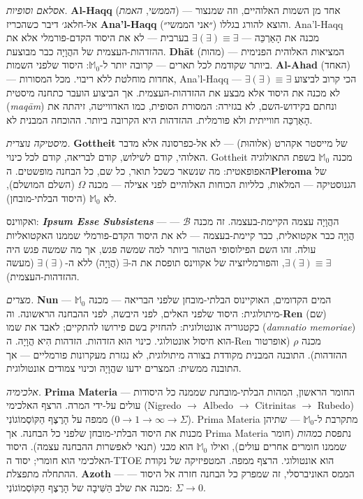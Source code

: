\documentclass[10pt, openany, oneside]{book}
\begin{document}
\textit{אסלאם וסופיות.} \textbf{Al-Haqq} (\textit{הממשי}, \textit{האמת}) — אחד מן השמות האלוהיים, וזה שמנצור אל-חלאג׳ דיבר כשהכריז \textbf{Ana'l-Haqq} (״אני הממשי״) והוצא להורג בגללו. Ana'l-Haqq מכנה את הָאַרְכֵּה — $\exists(\exists) \equiv \exists$ בערבית — לא את היסוד הקדם-פורמלי אלא את ההזדהות-העצמית של ההֲוָיָה כבר מבוצעת. \textbf{Dhāt} (מהות) — המציאות האלוהית הפנימית ביותר שקודמת לכל תארים — קרובה יותר ל-$\mathbb{M}_0$: היסוד שלפני השמות. \textbf{Al-Ahad} (האחד) — אחדות מוחלטת ללא ריבוי. מכל המסורות, Ana'l-Haqq הכי קרוב לביצוע $\exists(\exists) \equiv \exists$ — לא מכנה את היסוד אלא מבצע את ההזדהות-העצמית. אך הביצוע הועבר כתחנה מיסטית (\textit{maqām}) ונחתם בקידוש-השם, לא בגזירה: המסורת הסופית, כמו האדווייטה, זיהתה את הָאַרְכֵּה חווייתית ולא פורמלית. ההזדהות היא הקרובה ביותר. ההוכחה המבנית לא.

\textit{מיסטיקה נוצרית.} \textbf{Gottheit} של מייסטר אקהרט (אלוהוּת) — לא אל-כפרסונה אלא מדבר האלוהי, קודם לשילוש, קודם לבריאה, קודם לכל כינוי. Gottheit מכנה $\mathbb{M}_0$ בשפת התאולוגיה האפופאטית: מה שנשאר כשכל תואר, כל שם, כל הבחנה מופשטים. ה\textbf{Pleroma} של הגנוסטיקה — המלאות, כלליות הכוחות האלוהיים לפני אצילה — מכנה $\Omega$ (השלם המושלם), לא $\mathbb{M}_0$ (היסוד הבלתי-מובחן).

ואקווינס: \textbf{\textit{Ipsum Esse Subsistens}} — ההֲוָיָה עצמה הקיימת-בעצמה. זה מכנה $\mathcal{B}$ — הֲוָיָה כבר אקטואלית, כבר קיימת-בעצמה — לא את היסוד הקדם-פורמלי שממנו האקטואליות עולה. זהו השם הפילוסופי הטהור ביותר למה שמשה פגש, אך מה שמשה פגש היה $\exists(\exists) \equiv \exists$, והפורמליזציה של אקווינס תופסת את ה-$\exists$ (הֲוָיָה) ללא ה-$\exists(\exists)$ (מעשה ההזדהות-העצמית).

\textit{מצרים.} \textbf{Nun} — המים הקדומים, האוקיינוס הבלתי-מובחן שלפני הבריאה — מכנה $\mathbb{M}_0$ מיתולוגית: היסוד שלפני האלים, לפני היבשה, לפני ההבחנה הראשונה. וה-\textbf{Ren} (שם) כקטגוריה אונטולוגית: להחזיק בשם פירושו להתקיים; לאבד את שמו (\textit{damnatio memoriae}) הוא חיסול אונטולוגי. כינוי הוּא הזדהות. הזדהות הִיא הֲוָיָה. ה-Ren מכנה $\rho$ (אופרטור ההזדהות). התובנה המבנית מקודדת בצורה מיתולוגית, לא נגזרת מעקרונות פורמליים — אך התובנה ממשית: המצרים ידעו שהֲוָיָה וכינוי צמודים אונטולוגית.

\textit{אלכימיה.} \textbf{Prima Materia} — החומר הראשון, המהות הבלתי-מובחנת שממנה כל היסודות עולים על-ידי המרה. הרצף האלכימי (Nigredo $\to$ Albedo $\to$ Citrinitas $\to$ Rubedo) ממפה על הָרֶצֶף הַקּוֹסְמוֹגוֹנִי ($0 \to 1 \to \infty \to \Sigma$). Prima Materia מתקרבת ל-$\mathbb{M}_0$ — שתיהן מכנות את היסוד הבלתי-מובחן שלפני כל הבחנה. אך Prima Materia נתפסת כ\textit{מהות} (חומר שממנו חומרים אחרים עולים), ואילו $\mathbb{M}_0$ הוא \textit{מבני} (תנאי לאפשרות ההבחנה עצמה). היסוד האלכימי הוא חומרי; יסוד ה-TTOE הוא אונטולוגי. הרצף ממפה. המטפיזיקה של נקודת ההתחלה מתפצלת. \textbf{Azoth} — הממס האוניברסלי, זה שמפרק כל הבחנה חזרה אל היסוד — מכנה את שלב הַשִּׁיבָה של הָרֶצֶף הַקּוֹסְמוֹגוֹנִי: $\Sigma \to 0$.
\end{document}
